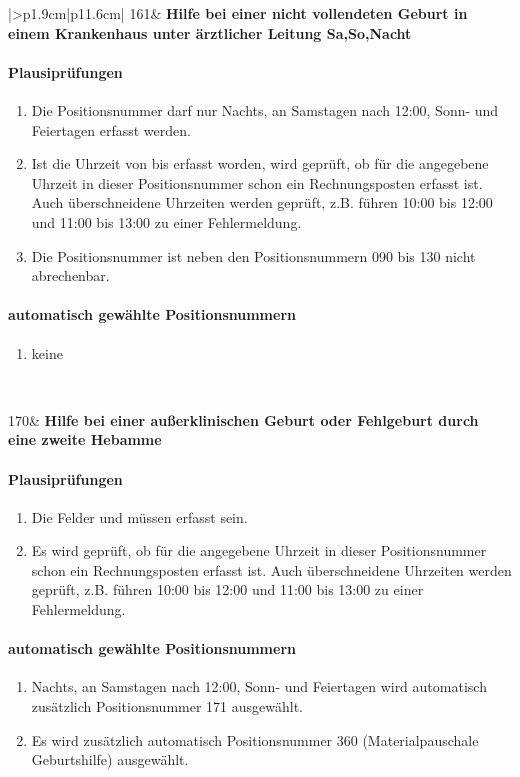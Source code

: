 \begin{mpsupertabular}{|>{\centering}p{1.9cm}|p{11.6cm}|}
161&
\textbf{Hilfe bei einer nicht vollendeten Geburt in einem Krankenhaus
unter ärztlicher Leitung Sa,So,Nacht}
\paragraph{Plausiprüfungen}
\begin{enumerate}
\item
Die Positionsnummer darf nur Nachts, an Samstagen nach 12:00, 
Sonn- und Feiertagen erfasst werden.
\item
Ist die Uhrzeit von bis erfasst worden, wird geprüft, ob für die angegebene 
Uhrzeit in dieser Positionsnummer
schon ein Rechnungsposten erfasst ist. Auch überschneidene Uhrzeiten
werden geprüft, z.B. führen 10:00 bis 12:00 und 11:00 bis 13:00 zu einer
Fehlermeldung.
\item
Die Positionsnummer ist neben den Positionsnummern 090 bis 130 nicht
abrechenbar.
\end{enumerate}
\paragraph{automatisch gewählte Positionsnummern}
\begin{enumerate}
\item
keine
\end{enumerate}
\\ \hline


170&
\textbf{Hilfe bei einer außerklinischen Geburt oder Fehlgeburt durch eine
zweite Hebamme}
\paragraph{Plausiprüfungen}
\begin{enumerate}
\item
Die Felder  und  müssen erfasst sein.
\item
Es wird geprüft, ob für die angegebene Uhrzeit in dieser Positionsnummer
schon ein Rechnungsposten erfasst ist. Auch überschneidene Uhrzeiten
werden geprüft, z.B. führen 10:00 bis 12:00 und 11:00 bis 13:00 zu einer
Fehlermeldung.
\end{enumerate}
\paragraph{automatisch gewählte Positionsnummern}
\begin{enumerate}
\item
Nachts, an Samstagen nach 12:00, Sonn- und Feiertagen wird automatisch 
zusätzlich Positionsnummer 171 ausgewählt.
\item
Es wird zusätzlich automatisch Positionsnummer 360 (Materialpauschale 
Geburtshilfe) ausgewählt.
\end{enumerate}
\\ \hline



\end{mpsupertabular}
